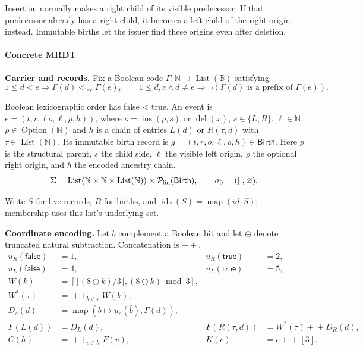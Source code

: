 

Insertion normally makes a right child of its visible predecessor. If that predecessor already has a right child, it becomes a left child of the right origin instead. Immutable births let the issuer find these origins even after deletion.

\paragraph{Concrete MRDT}
\textbf{Carrier and records.} Fix a Boolean code $\Gamma:\mathbb N\to\operatorname{List}(\mathbb B)$ satisfying
\[
1\le d<e\Rightarrow\Gamma(d)<_{\mathrm{lex}}\Gamma(e),\qquad 1\le d,e\land d\ne e\Rightarrow\neg(\Gamma(d)\text{ is a prefix of }\Gamma(e)).
\]

Boolean lexicographic order has false < true. An event is $e=(t,r,(o,\ell,\rho,h))$, where $o=\operatorname{ins}(p,s)$ or $\operatorname{del}(x)$, $s\in\{L,R\}$, $\ell\in\mathbb N$, $\rho\in\operatorname{Option}(\mathbb N)$ and $h$ is a chain of entries $L(d)$ or $R(\tau,d)$ with $\tau\in\operatorname{List}(\mathbb N)$. Its immutable birth record is $g=(t,r,o,\ell,\rho,h)\in\mathsf{Birth}$. Here $p$ is the structural parent, $s$ the child side, $\ell$ the visible left origin, $\rho$ the optional right origin, and $h$ the encoded ancestry chain.
\[
\Sigma=\operatorname{List}(\mathbb N\times\mathbb N\times\operatorname{List}(\mathbb N))\times\mathcal P_{\rm fin}(\mathsf{Birth}),\qquad\sigma_0=([],\varnothing).
\]

Write $S$ for live records, $B$ for births, and $\operatorname{ids}(S)=\operatorname{map}(id,S)$; membership uses this list's underlying set.

\textbf{Coordinate encoding.} Let $\bar b$ complement a Boolean bit and let $\mathbin{\ominus}$ denote truncated natural subtraction. Concatenation is $+\!+$.
\[
\begin{aligned}u_R(\mathsf{false})&=1,&u_R(\mathsf{true})&=2,\\u_L(\mathsf{false})&=4,&u_L(\mathsf{true})&=5,\\W(k)&=[\lfloor(8\mathbin{\ominus} k)/3\rfloor,(8\mathbin{\ominus} k)\bmod3],\\W^*(\tau)&=\mathop{+\!+}_{k\in\tau}W(k),\\D_s(d)&=\operatorname{map}(b\mapsto u_s(\bar b),\Gamma(d)),\\F(L(d))&=D_L(d),&F(R(\tau,d))&=W^*(\tau)+\!+D_R(d),\\C(h)&=\mathop{+\!+}_{v\in h}F(v),&K(c)&=c+\!+[3].\end{aligned}
\]

